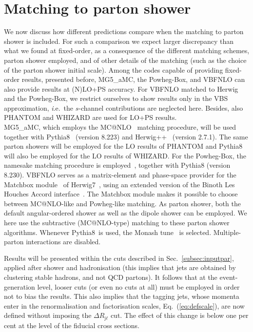 \documentclass[twocolumn,epjc3]{svjour3} %
\newcommand{\Pl}{\ell}
\newcommand{\Pj}{\ensuremath{\text{j}}\xspace}
\begin{document}
\section{Matching to parton shower}
    \label{sec:matching}
We now discuss how different predictions compare when the matching to parton shower is included. For such
a comparison we expect larger discrepancy than what we found at fixed-order, as a consequence of the different
matching schemes, parton shower employed, and of other details of the matching (such as the choice of the parton shower initial scale). Among
the codes capable of providing fixed-order results, presented before, {\sc MG5\_aMC}, the {\sc Powheg-Box}, and {\sc VBFNLO}
can also provide results at (N)LO+PS accuracy. For {\sc VBFNLO} matched to {\sc Herwig} and the {\sc Powheg-Box}, we
restrict ourselves to show results only in the VBS approximation,
{\emph i.e.}\ the $s$-channel contributions are neglected here. Besides,
also {\sc PHANTOM} and {\sc WHIZARD} are used for LO+PS results.\\
{\sc MG5\_aMC}, which
employs the {\sc MC@NLO}~\cite{Frixione:2002ik} matching procedure, will be used together with {\sc Pythia8}~\cite{Sjostrand:2014zea} (version 8.223)
and {\sc Herwig++}~\cite{Bahr:2008pv, Bellm:2013hwb} (version 2.7.1). The same parton showers will be employed for the LO results of {\sc PHANTOM} and {\sc Pythia8} will also be employed for the LO results of {\sc WHIZARD}. For the {\sc Powheg-Box}, the namesake
matching procedure is employed~\cite{Nason:2004rx,Frixione:2007vw}, together with {\sc Pythia8} (version 8.230). {\sc VBFNLO} serves as a matrix-element and phase-space provider
for the {\sc Matchbox} module~\cite{Platzer:2011bc} of {\sc
Herwig7}~\cite{Bellm:2015jjp,Bellm:2017bvx}, using an extended version of the Binoth Les Houches Accord
interface~\cite{Binoth:2010xt,Alioli:2013nda,Andersen:2014efa}. The {\sc Matchbox} module makes it
possible to choose between {\sc MC\-@NLO}-like and {\sc Powheg}-like
matching. As parton shower, both the default angular-ordered shower as
well as the dipole shower can be employed. We here use the subtractive (MC@NLO-type) matching to these parton shower algorithms.
Whenever {\sc Pythia8}\ is used, the Monash tune~\cite{Skands:2014pea} is selected. Multiple-parton interactions are disabled.

Results will be presented within the cuts described in Sec.~\ref{subsec:inputpar}, applied after shower and hadronisation (this implies that jets
are obtained by clustering stable hadrons, and not QCD partons). It follows that at the event-generation level, looser cuts (or even no cuts at all)
must be employed in order not to bias the results. This also implies that the tagging jets, whose momenta enter in the 
renormalisation and factorisation scales, Eq.~(\ref{eq:defscale}), are now defined without imposing
the $\Delta R_{\Pj\Pl}$ cut. The effect of this change is below one per cent at the level of the fiducial cross sections.
\end{document}
